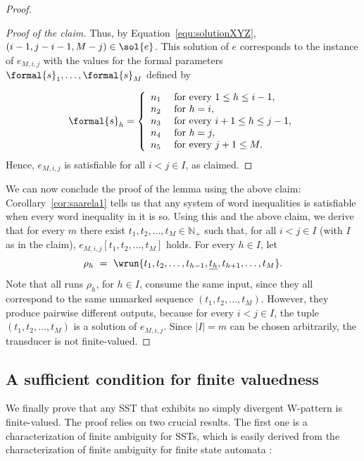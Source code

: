 \documentclass{article}
\begin{document}
\begin{proof}
\begin{proof}[Proof of the claim]
Thus, by Equation~\eqref{equ:solutionXYZ},
$(i - 1, j - i - 1, M - j) \in \sol{e}$. 
This solution of $e$ corresponds to the instance of  $e_{M,i,j}$ 
with the values for the formal parameters $\formal{s}_1,\dots,\formal{s}_M$
defined by

\[
\formal{s}_h = \left\{
\begin{array}{lll}
n_1 & \textup{ for every } 1 \leq h \leq i-1,\\
n_2 & \textup{ for } h = i,\\
n_3 & \textup{ for every } i+1 \leq h \leq j-1,\\
n_4 & \textup{ for } h = j,\\
n_5 & \textup{ for every } j+1 \leq M.
\end{array}
\right.
\]
Hence, $e_{M,i,j}$ is satisfiable for all $i<j \in I$, as claimed.
\end{proof}

We can now conclude the proof of the lemma using the above claim:
Corollary~\ref{cor:saarela1} tells us that any system of word inequalities 
is satisfiable when every word inequality in it is so.
Using this and the above claim, we derive that for every $m$ there exist 
$t_1,t_2,\ldots,t_M \in \mathbb{N}_+$ such that, for all $i<j\in I$ (with $I$ as in the claim),
$e_{M,i,j}[t_1,t_2,\ldots,t_M]$ holds.
For every $h \in I$, let
\[
    \rho_h ~=~ 
    \wrun{t_1,t_2,\ldots,t_{h-1},\underline{t_{h}},t_{h+1}, \ldots ,t_M}.
\]
Note that all runs $\rho_h$, for $h \in I$, consume the same input,
since they all correspond to the same unmarked sequence
$(t_1,t_2,\ldots, t_M)$.
However, they produce pairwise different outputs, because 
for every $i<j \in I$, the tuple $(t_1,t_2,\ldots,t_M)$
is a solution of $e_{M,i,j}$. 
Since $|I|=m$ can be chosen arbitrarily, the transducer is not finite-valued. 
\end{proof}

\subsection{A sufficient condition for finite valuedness}
\label{subsec:right-to-left}

We finally prove that  any SST that exhibits  no 
simply divergent W-pattern is finite-valued.
The proof relies on two crucial results.
The first one is a characterization of finite ambiguity
for SSTs, which is easily derived from  the characterization
of finite ambiguity for finite state automata
\cite{finite-ambiguity1977simon,finite-ambiguity1977jacob,seidl91,AllauzenMR11}:
\end{document}
